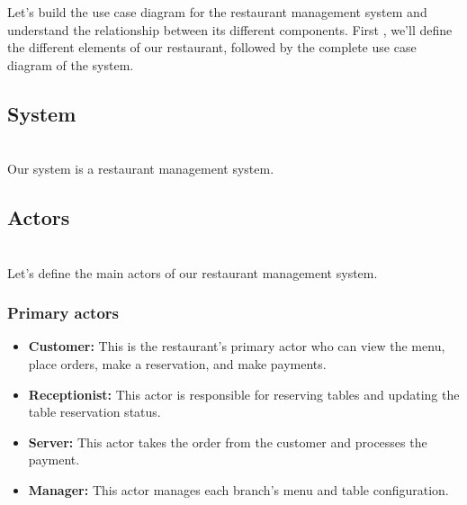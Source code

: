 

Let's build the use case diagram for the restaurant management system and understand the relationship between its different components. First , we'll define the different elements of our restaurant, followed by the complete use case diagram of the system.

\subsection{System}\label{xaJUmYRjdS5aQ6FH2EsMB}
\\
Our system is a restaurant management system.

\subsection{Actors}\label{WJjT6kjYegHoXrd54bxdE}
\\
Let's define the main actors of our restaurant management system.

\subsubsection{Primary actors}\label{wBsFP5uLmDkqwS1l_Z28n}

\begin{itemize}
\item
\protect{}\label{WouBZyJ5T5felzIs_c0ZC}
\textbf{Customer:} This is the restaurant's primary actor who can view the menu, place orders, make a reservation, and make payments.
\item
\protect{}\label{lrgy0egSv6DGdij3WJZum}
\textbf{Receptionist:} This actor is responsible for reserving tables and updating the table reservation status.
\item
\protect{}\label{0jO2tLUERdbT8kGwjHSlU}
\textbf{Server:} This actor takes the order from the customer and processes the payment.
\item
\protect{}\label{875SBRNrh1Jy9iGLvU7YS}
\textbf{Manager:} This actor manages each branch's menu and table configuration.
\end{itemize}


